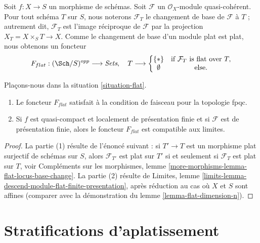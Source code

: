 \begin{situation}
\label{situation-flat}
Soit $f : X \to S$ un morphisme de schémas.
Soit $\mathcal{F}$ un $\mathcal{O}_X$-module quasi-cohérent.
Pour tout schéma $T$ sur $S$, nous noterons $\mathcal{F}_T$ le
changement de base de $\mathcal{F}$ à $T$ ; autrement dit, $\mathcal{F}_T$
est l'image réciproque de $\mathcal{F}$ par la projection
$X_T = X \times_S T \to X$. Comme le changement de base d'un module plat
est plat, nous obtenons un foncteur
\begin{equation}
\label{equation-flat}
F_{flat} : (\Sch/S)^{opp} \longrightarrow \textit{Sets}, \quad
T \longrightarrow \left\{
\begin{matrix}
\{*\} & \text{if } \mathcal{F}_T \text{ is flat over }T, \\
\emptyset & \text{else.}
\end{matrix}
\right.
\end{equation}
\end{situation}

\begin{lemma}
\label{lemma-flat}
Plaçons-nous dans la situation \ref{situation-flat}.
\begin{enumerate}
\item Le foncteur $F_{flat}$ satisfait à la condition de faisceau pour la topologie fpqc.
\item Si $f$ est quasi-compact et localement de présentation finie
et si $\mathcal{F}$ est de présentation finie, alors le foncteur
$F_{flat}$ est compatible aux limites.
\end{enumerate}
\end{lemma}

\begin{proof}
La partie (1) résulte de l'énoncé suivant : si $T' \to T$ est un morphisme plat
surjectif de schémas sur $S$, alors $\mathcal{F}_{T'}$ est plat sur $T'$
si et seulement si $\mathcal{F}_T$ est plat sur $T$, voir
Compléments sur les morphismes, lemme \ref{more-morphisms-lemma-flat-locus-base-change}.
La partie (2) résulte de
Limites, lemme \ref{limits-lemma-descend-module-flat-finite-presentation},
après réduction au cas où $X$ et $S$ sont affines (comparer avec
la démonstration du
lemme \ref{lemma-flat-dimension-n}).
\end{proof}




\section{Stratifications d'aplatissement}
\label{section-flattening}

